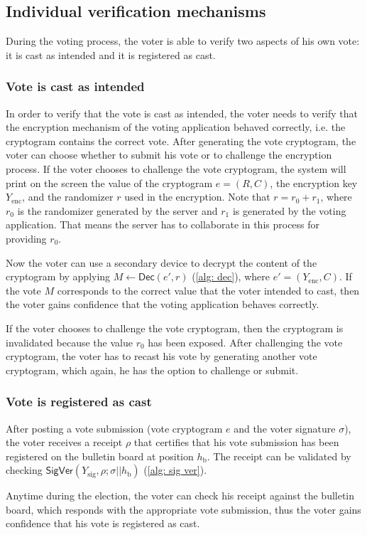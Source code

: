 \subsection{Individual verification mechanisms} \label{sec: individual verification mechanisms}
During the voting process, the voter is able to verify two aspects of his own vote: it is cast as intended and it is registered as cast.


\subsubsection{Vote is cast as intended}
In order to verify that the vote is cast as intended, the voter needs to verify that the encryption mechanism of the voting application behaved correctly, i.e. the cryptogram contains the correct vote. After generating the vote cryptogram, the voter can choose whether to submit his vote or to challenge the encryption process. If the voter chooses to challenge the vote cryptogram, the system will print on the screen the value of the cryptogram $e = (R, C)$, the encryption key $Y_\mathrm{enc}$, and the randomizer $r$ used in the encryption. Note that \( r = r_0 + r_1 \), where $r_0$ is the randomizer generated by the server and $r_1$ is generated by the voting application. That means the server has to collaborate in this process for providing $r_0$.

Now the voter can use a secondary device to decrypt the content of the cryptogram by applying \( M \gets \mathsf{Dec} (e', r) \) (\cref{alg: dec}), where $e' = (Y_\mathrm{enc}, C)$. If the vote $M$ corresponds to the correct value that the voter intended to cast, then the voter gains confidence that the voting application behaves correctly.

If the voter chooses to challenge the vote cryptogram, then the cryptogram is invalidated because the value $r_0$ has been exposed. After challenging the vote cryptogram, the voter has to recast his vote by generating another vote cryptogram, which again, he has the option to challenge or submit.

 
\subsubsection{Vote is registered as cast} \label{sec: vote is registered as cast}
After posting a vote submission (vote cryptogram $e$ and the voter signature $\sigma$), the voter receives a receipt $\rho$ that certifies that his vote submission has been registered on the bulletin board at position $h_\mathrm{b}$. The receipt can be validated by checking \( \mathsf{SigVer} (Y_\mathrm{sig}, \rho; \sigma || h_\mathrm{b}) \) (\cref{alg: sig ver}).

Anytime during the election, the voter can check his receipt against the bulletin board, which responds with the appropriate vote submission, thus the voter gains confidence that his vote is registered as cast.
